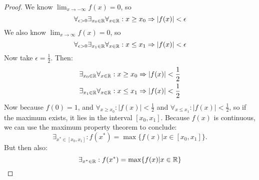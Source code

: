 \documentclass[week=6]{homework}
\begin{document}
\begin{questions}
        \begin{proof}
        	We know $\lim_{x \to - \infty} f(x) = 0$, so 
        	\[
	        	\forall_{\epsilon > 0} \exists_{x_0 \in \reals} \forall_{x \in \reals} : x \ge x_0 \Rightarrow |f(x)| < \epsilon
        	\]
        	We also know $\lim_{x \to  \infty} f(x) = 0$, so
        	\[
	        	\forall_{\epsilon > 0} \exists_{x_1 \in \reals} \forall_{x \in \reals} : x \le x_1 \Rightarrow |f(x)| < \epsilon
        	\]
        	Now take $\epsilon = \frac{1}{2}$. Then:
        	\begin{align*}
        		\exists_{x_0 \in \mathbb{R}} \forall_{x \in \mathbb{R}} : x \ge x_0 &\Rightarrow |f(x)| < \frac{1}{2} \\
        		\exists_{x_1 \in \mathbb{R}} \forall_{x \in \mathbb{R}} : x \le x_1 &\Rightarrow |f(x)| < \frac{1}{2}
        	\end{align*}
        	Now because $f(0) = 1$, and $\forall_{x \ge x_0} : |f(x)| < \frac{1}{2} $ and $\forall_{x \le x_1} : |f(x)| < \frac{1}{2} $, so if the maximum exists, it lies in the interval $[x_0, x_1]$. Because $f(x)$ is continuous, we can use the maximum property theorem to conclude:
        	\[
	        	\exists_{x^* \in [x_0, x_1]} : f(x^*) = \max\{f(x) | x \in [x_0, x_1] \}. 
        	\]
        	But then also:
        	\[
	        	\exists_{x^* \in \mathbb{R}} : f(x^*) = \max\{f(x) | x \in \mathbb{R} \}
        	\]
        \end{proof}
        
     \end{questions}
\end{document}
